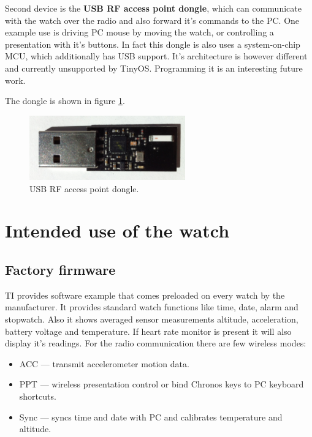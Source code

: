 Second device is the {\bf USB RF access point dongle}, which can
communicate with the watch over the radio and also forward it's
commands to the PC. One example use is driving PC mouse by moving the
watch, or controlling a presentation with it's buttons. In fact this
dongle is also uses a system-on-chip MCU, which additionally has USB
support. It's architecture is however different and currently
unsupported by TinyOS. Programming it is an interesting future work.

The dongle is shown in figure \ref{fig:chronos_rfdongle}.

\begin{figure}[h]
  \centering
  \includegraphics[width=0.6\textwidth]{img/chronos_rfdongle.jpg}
  \caption{USB RF access point dongle.}
  \label{fig:chronos_rfdongle}
\end{figure}

\section{Intended use of the watch}

\subsection{Factory firmware}

TI provides software example that comes preloaded on every watch by
the manufacturer. It provides standard watch functions like time,
date, alarm and stopwatch. Also it shows averaged sensor measurements
altitude, acceleration, battery voltage and temperature. If heart
rate monitor is present it will also display it's readings. For the
radio communication there are few wireless modes:

\begin{itemize}
  \item ACC --- transmit accelerometer motion data.
  \item PPT --- wireless presentation control or bind Chronos
    keys to PC keyboard shortcuts.
  \item Sync --- syncs time and date with PC and calibrates
    temperature and altitude.
\end{itemize}

